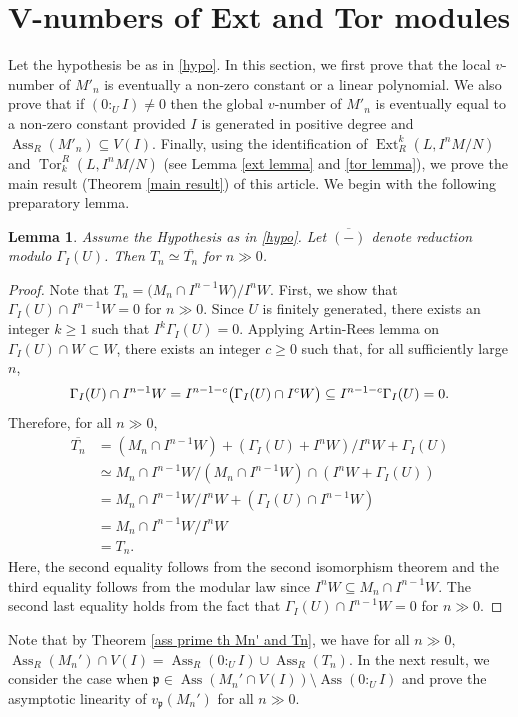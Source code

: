 \documentclass[11pt,reqno]{amsart}
\newtheorem{lemma}[theorem]{Lemma}
\theoremstyle{definition}
\newcommand{\p}{\mathfrak{p}}
\newcommand{\Ass}{\operatorname{Ass}}
\newcommand{\Ext}{\operatorname{Ext}}
\newcommand{\Tor}{\operatorname{Tor}}
\begin{document}
\section{V-numbers of Ext and Tor modules}
Let the hypothesis be as in \ref{hypo}. In this section, we first prove that the local $v$-number of $M'_n$ is eventually a non-zero constant or a linear polynomial. We also prove that if $(0:_UI)\neq 0$ then the global $v$-number of $M'_n$ is eventually equal to a non-zero constant provided  $I$ is generated in positive degree and  $\Ass_R (M'_n) \subseteq V(I)$. Finally, using the identification of $\Ext^k_R(L,I^nM/N)$ and  $\Tor_k^R(L,I^nM/N)$ (see Lemma \ref{ext lemma} and \ref{tor lemma}), we prove the main result (Theorem \ref{main result}) of this article. 
 We begin with the following preparatory lemma.
\begin{lemma}\label{lem2}
Assume the Hypothesis as in \ref{hypo}. Let $\overline{(-)}$ denote reduction modulo $\Gamma_I(U)$.
Then $T_n\simeq\overline{T_n}$ for $n\gg 0$.
\end{lemma}

\begin{proof}
Note that
$T_n={(M_n\cap I^{n-1}W})/{I^nW}.$
First, we show that $\Gamma_I(U)\cap I^{n-1}W=0$
for $n\gg 0$. Since $U$ is finitely generated,
there exists an integer $k\geq 1$ such that
$I^k\Gamma_I(U)=0$. Applying  Artin-Rees lemma on $\Gamma_I(U)\cap W \subset W$,
there exists an integer $c\geq 0$ such that, for all sufficiently large $n$,
$$
\Gamma_I(U)\cap I^{n-1}W
=I^{n-1-c}
  \bigl(\Gamma_I(U)\cap I^cW\bigr)\\
\subseteq I^{n-1-c}\Gamma_I(U)\\
=0.$$
Therefore, for all $n\gg 0$,
\begin{align*}
\overline{T_n}
&={(M_n\cap
I^{n-1}W)+(\Gamma_I(U)+I^nW)}/{I^nW+\Gamma_I(U)}\\
&\simeq M_n\cap I^{n-1}W/(M_n\cap
I^{n-1}W)\cap ({I^nW+\Gamma_I(U)})\\
&=
 M_n\cap I^{n-1}W/I^nW+
{(\Gamma_I(U)\cap I^{n-1}W)} \\
&={M_n\cap I^{n-1}W}/
{I^nW}\\
&=T_n.
\end{align*}
Here, the second equality follows from the second isomorphism theorem and the third equality follows from the modular law since $I^nW\subseteq M_n\cap
I^{n-1}W$. The second last equality holds from the fact that $\Gamma_I(U)\cap I^{n-1}W=0$ for $n\gg 0$.
\end{proof}
 Note that by Theorem \ref{ass prime th Mn' and Tn}, we have for all $n\gg0,$ $\Ass_R (M_n')\cap V(I)=\Ass_R (0:_U I)\cup\Ass_R (T_n)$. In the next result, we consider the case when $\p\in \Ass (M_n'\cap V(I))\setminus \Ass (0:_UI)$ and prove the asymptotic linearity of $v_\p(M_n')$ for all $n\gg0.$
\end{document}
